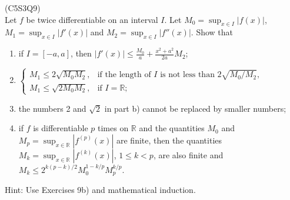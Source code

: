 \begin{prb}
    (C5S3Q9) \\
    Let $f$ be twice differentiable on an interval $I$. Let $M_0 = \sup_{x \in I} |f(x)|$, $M_1 = \sup_{x \in I} |f'(x)|$ and $M_2 = \sup_{x \in I} |f''(x)|$. Show that
    \begin{enumerate}
        \item[a)] if $I = [-a, a]$, then $|f'(x)| \leq \frac{M_0}{a} + \frac{x^2 + a^2}{2a} M_2$;
        \item[b)] $\begin{cases} M_1 \leq 2\sqrt{M_0M_2}, & \text{if the length of } I \text{ is not less than } 2\sqrt{M_0/M_2}, \\ M_1 \leq \sqrt{2M_0M_2}, & \text{if } I = \mathbb{R}; \end{cases}$
        \item[c)] the numbers 2 and $\sqrt{2}$ in part b) cannot be replaced by smaller numbers;
        \item[d)] if $f$ is differentiable $p$ times on $\mathbb{R}$ and the quantities $M_0$ and $M_p = \sup_{x \in \mathbb{R}} |f^{(p)}(x)|$ are finite, then the quantities $M_k = \sup_{x \in \mathbb{R}} 
        |f^{(k)}(x)|$, $1 \leq k < p$, are also finite and $M_k \leq 2^{k(p-k)/2} M_0^{1-k/p} M_p^{k/p}$.
    \end{enumerate}
    Hint: Use Exercises 9b) and mathematical induction.
\end{prb}
